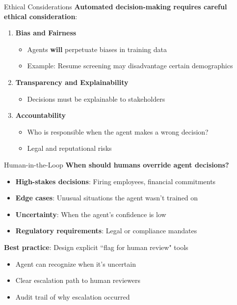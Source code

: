 \documentclass[aspectratio=169]{beamer}
\begin{document}
\begin{frame}{Ethical Considerations}
\textbf{Automated decision-making requires careful ethical consideration}:
\vspace{0.3cm}

\begin{enumerate}
    \item \textbf{Bias and Fairness}
    \begin{itemize}
        \item Agents \textbf{will} perpetuate biases in training data
        \item Example: Resume screening may disadvantage certain demographics
    \end{itemize}
    \vspace{0.15cm}

    \item \textbf{Transparency and Explainability}
    \begin{itemize}
        \item Decisions must be explainable to stakeholders
    \end{itemize}
    \vspace{0.15cm}

    \item \textbf{Accountability}
    \begin{itemize}
        \item Who is responsible when the agent makes a wrong decision?
        \item Legal and reputational risks
    \end{itemize}
\end{enumerate}
\end{frame}

\begin{frame}{Human-in-the-Loop}
\textbf{When should humans override agent decisions?}
\vspace{0.3cm}

\begin{itemize}
    \item \textbf{High-stakes decisions}: Firing employees, financial commitments
    \item \textbf{Edge cases}: Unusual situations the agent wasn't trained on
    \item \textbf{Uncertainty}: When the agent's confidence is low
    \item \textbf{Regulatory requirements}: Legal or compliance mandates
\end{itemize}
\vspace{0.3cm}

\textbf{Best practice}: Design explicit ``flag for human review" tools
\begin{itemize}
    \item Agent can recognize when it's uncertain
    \item Clear escalation path to human reviewers
    \item Audit trail of why escalation occurred
\end{itemize}
\end{frame}
\end{document}
